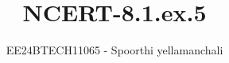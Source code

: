 \documentclass[journal]{IEEEtran}
\begin{document}

\vspace{3cm}

\title{NCERT-8.1.ex.5}
\author{EE24BTECH11065 - Spoorthi yellamanchali
}
{\let\newpage\relax\maketitle}

\renewcommand{\thefigure}{\theenumi}
\renewcommand{\thetable}{\theenumi}
\setlength{\intextsep}{10pt} %


\renewcommand{\thetable}{\theenumi}
\end{document}
